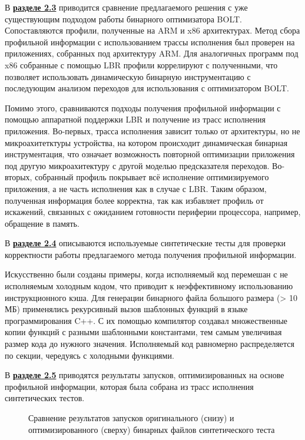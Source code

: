 В \underline{\textbf{разделе 2.3}} приводится сравнение предлагаемого решения с уже существующим подходом работы бинарного оптимизатора BOLT. Сопоставляются профили, полученные на ARM и x86 архитектурах. Метод сбора профильной информации с использованием трассы исполнения был проверен на приложениях, собранных под архитектуру ARM. Для аналогичных программ под x86 собранные с помощью LBR профили коррелируют с полученными, что позволяет использовать динамическую бинарную инструментацию с последующим анализом переходов для использования с оптимизатором BOLT.

Помимо этого, сравниваются подходы получения профильной информации с помощью аппаратной поддержки LBR и получение из трасс исполнения приложения. Во-первых, трасса исполнения зависит только от архитектуры, но не микроахитетктуры устройства, на котором происходит динамическая бинарная инструментация, что означает возможность повторной оптимизации приложения под другую микроахитектуру с другой моделью предсказателя переходов. Во-вторых, собранный профиль покрывает всё исполнение оптимизируемого приложения, а не часть исполнения как в случае с LBR. Таким образом, полученная информация более корректна, так как избавляет профиль от искажений, связанных с ожиданием готовности периферии процессора, например, обращение в память.

В \underline{\textbf{разделе 2.4}} описываются используемые синтетические тесты для проверки корректности работы предлагаемого метода получения профильной информации.

Искусственно были созданы примеры, когда исполняемый код перемешан с не исполняемым холодным кодом, что приводит к неэффективному использованию инструкционного кэша. Для генерации бинарного файла большого размера (> 10 МБ) применялись рекурсивный вызов шаблонных функций в языке программирования C++. С их помощью компилятор создавал множественные копии функций с разными шаблонными константами, тем самым увеличивая размер кода до нужного значения. Исполняемый код равномерно распределяется по секции, чередуясь с холодными функциями. 

В \underline{\textbf{разделе 2.5}} приводятся результаты запусков, оптимизированных на основе профильной информации, которая была собрана из трасс исполнения синтетических тестов.

\begin{figure}[H]
    \centerfloat{
        \texttt{[image: 13]}
    }
    \caption{Сравнение результатов запусков оригинального (снизу) и оптимизированного (сверху) бинарных файлов синтетического теста}\label{fig:SynthRes}
\end{figure}

